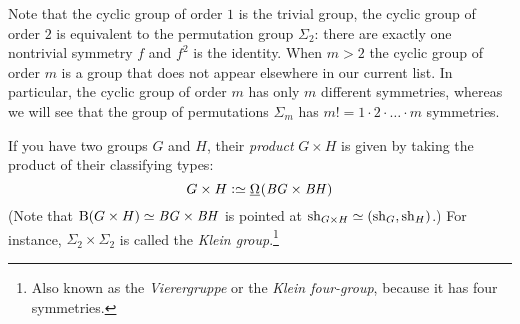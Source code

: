 \begin{example}



Note that the cyclic group of order $1$ is the trivial group, the cyclic group of order $2$ is equivalent to the permutation group $\Sigma_2$: there are exactly one nontrivial symmetry $f$ and $f^2$ is the identity.  When $m>2$ the cyclic group of order $m$ is a group that does not appear elsewhere in our current list.  In particular, the cyclic group of order $m$ has only $m$ different symmetries, whereas we will see that the group of permutations $\Sigma_m$ has $m!=1\cdot 2\cdot\dots\cdot m$ symmetries.
\end{example}

\begin{example}\label{ex:productofgroups}
  If you have two groups $G$ and $H$, their \emph{product} $G\times H$ is given by taking the product of their classifying types:
  \[
    G\times H\defequi \mkgroup(\BG\times\BH)
  \]
  (Note that $\B(G\times H)\jdeq \BG\times \BH$ is pointed at
  $\sh_{G\times H}\jdeq(\sh_G,\sh_H)$.)
  For instance, $\Sigma_2\times\Sigma_2$ is called the
  \emph{Klein group}.\footnote{%
    Also known as the \emph{Vierergruppe} or
    the \emph{Klein four-group}, because
    it has four symmetries.}
\end{example}

